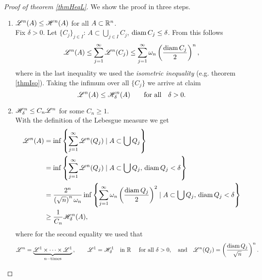 \begin{proof}[Proof of theorem \ref{thmHeqL}]
We show the proof in three steps.~
\begin{enumerate}
\item $\mathscr{L}^{n}(A) \leq \mathscr{H}^{n}(A)$ for all $A \subset \mathbb{R}^n$.
\\
Fix $\delta > 0$. Let $\{C_j\}_{j\in I}$: $A \subset \bigcup_{j\in I} C_j$, $\operatorname{diam}
C_j \leq \delta$. From this follows 
\[
\mathscr{L}^{n}(A) \leq \sum_{j=1}^\infty \mathscr{L}^{n}(C_j) \leq
\sum_{j=1}^\infty \omega_n \left(\frac{\operatorname{diam} C_j}{2}\right)^n,
\]
where in the last inequality we used the \emph{isometric
inequality} (e.g. theorem \ref{thmIso}). Taking the
infimum over all $\{C_j\}$ we arrive at claim
\[
\mathscr{L}^{n}(A) \leq \mathscr{H}^{n}_\delta (A) \qquad \text{for all} \quad
\delta > 0.
\]
\item $\mathscr{H}^{n}_{\delta} \leq C_n \mathscr{L}^{n}$ for some $C_n \geq 1$.
\\
With the definition of the Lebesgue measure we get
\[
\begin{aligned}
\mathscr{L}^{n}(A) 
&= \inf\left\{ \sum_{j=1}^\infty \mathscr{L}^{n}(Q_j) \mid A
\subset \bigcup Q_j\right\}
\\&= \inf\left\{ \sum_{j=1}^\infty \mathscr{L}^{n}(Q_j) \mid A
\subset \bigcup Q_j,\, \operatorname{diam} Q_j < \delta \right\}
\\& = \frac{2^n}{\left(\sqrt{n}\right)^n \omega_n} \inf
\left\{\sum_{j=1}^\infty \omega_n \left(\frac{\operatorname{diam} Q_j}{2}\right)^2 \mid 
A \subset \bigcup Q_j,\, \operatorname{diam} Q_j < \delta\right\}
\\&\geq \frac{1}{C_n} \mathscr{H}^{n}_\delta (A),
\end{aligned}
\]
where for the second equality we used that 
\[
\mathscr{L}^{n} = \underbrace{\mathscr{L}^{1} \times \dots \times \mathscr{L}^{1}}_{n-\text{times}}\,,
\qquad 
\mathscr{L}^{1} = \mathscr{H}^{1}_\delta \quad \text{in } \mathbb{R} \quad \text{ for all } \delta > 0, 
\quad \text{and} \quad 
\mathscr{L}^{n}(Q_j) = \left(\frac{ \operatorname{diam}
Q_j}{\sqrt{n}}\right)^n.
\]


\end{enumerate}
\end{proof}
